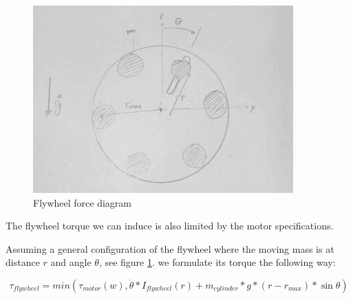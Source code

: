 \begin{figure}
	\centering
	\includegraphics[width=10cm]{img/flywheel_diagram.jpg}
	\caption{Flywheel force diagram}
	\label{fig:Flywheel force diagram}
\end{figure}

The flywheel torque we can induce is also limited by the motor specifications. 

Assuming a general configuration of the flywheel where the moving mass is at distance $r$ and angle $\theta$, see figure \ref{fig:Flywheel force diagram}. we formulate its torque the following way:

\begin{equation}\label{flywheel equation}
    \tau_{flywheel} = min(\tau_{motor} (w), \ddot{\theta}*I_{flywheel}(r) + m_{cylinder} * g * (r - r_{max}) * \sin{\theta})  
\end{equation}

